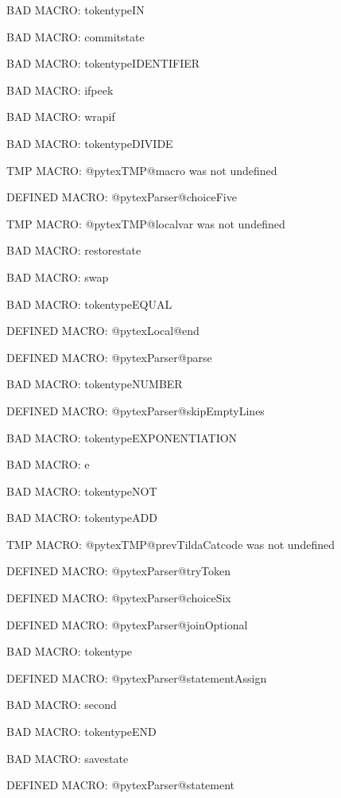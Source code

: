 BAD MACRO: tokentypeIN

BAD MACRO: commitstate

BAD MACRO: tokentypeIDENTIFIER

BAD MACRO: ifpeek

BAD MACRO: wrapif

BAD MACRO: tokentypeDIVIDE

\ifx\@pytexTMP@macro\undefined\else TMP MACRO: @pytexTMP@macro was not undefined
\fi

\ifx\@pytexParser@choiceFive\undefined\else DEFINED MACRO: @pytexParser@choiceFive
\fi

\ifx\@pytexTMP@localvar\undefined\else TMP MACRO: @pytexTMP@localvar was not undefined
\fi

BAD MACRO: restorestate

BAD MACRO: swap

BAD MACRO: tokentypeEQUAL

\ifx\@pytexLocal@end\undefined\else DEFINED MACRO: @pytexLocal@end
\fi

\ifx\@pytexParser@parse\undefined\else DEFINED MACRO: @pytexParser@parse
\fi

BAD MACRO: tokentypeNUMBER

\ifx\@pytexParser@skipEmptyLines\undefined\else DEFINED MACRO: @pytexParser@skipEmptyLines
\fi

BAD MACRO: tokentypeEXPONENTIATION

BAD MACRO: e

BAD MACRO: tokentypeNOT

BAD MACRO: tokentypeADD

\ifx\@pytexTMP@prevTildaCatcode\undefined\else TMP MACRO: @pytexTMP@prevTildaCatcode was not undefined
\fi

\ifx\@pytexParser@tryToken\undefined\else DEFINED MACRO: @pytexParser@tryToken
\fi

\ifx\@pytexParser@choiceSix\undefined\else DEFINED MACRO: @pytexParser@choiceSix
\fi

\ifx\@pytexParser@joinOptional\undefined\else DEFINED MACRO: @pytexParser@joinOptional
\fi

BAD MACRO: tokentype

\ifx\@pytexParser@statementAssign\undefined\else DEFINED MACRO: @pytexParser@statementAssign
\fi

BAD MACRO: second

BAD MACRO: tokentypeEND

BAD MACRO: savestate

\ifx\@pytexParser@statement\undefined\else DEFINED MACRO: @pytexParser@statement
\fi

